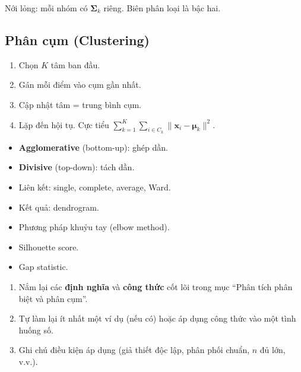 \documentclass[12pt,a4paper]{article}
\begin{document}
\begin{dinhnghia}[title={QDA (Quadratic DA)}]
  Nới lỏng: mỗi nhóm có $\boldsymbol{\Sigma}_k$ riêng. Biên phân loại là bậc hai.
\end{dinhnghia}

\subsection{Phân cụm (Clustering)}

\begin{phuongphap}[title={K-means}]
  \begin{enumerate}
    \item Chọn $K$ tâm ban đầu.
    \item Gán mỗi điểm vào cụm gần nhất.
    \item Cập nhật tâm = trung bình cụm.
    \item Lặp đến hội tụ. Cực tiểu $\sum_{k=1}^K \sum_{i \in C_k} \|\mathbf{x}_i - \boldsymbol{\mu}_k\|^2$.
  \end{enumerate}
\end{phuongphap}

\begin{phuongphap}[title={Phân cụm phân cấp}]
  \begin{itemize}
    \item \textbf{Agglomerative} (bottom-up): ghép dần.
    \item \textbf{Divisive} (top-down): tách dần.
    \item Liên kết: single, complete, average, Ward.
    \item Kết quả: dendrogram.
  \end{itemize}
\end{phuongphap}

\begin{phuongphap}[title={Chọn số cụm}]
  \begin{itemize}
    \item Phương pháp khuỷu tay (elbow method).
    \item Silhouette score.
    \item Gap statistic.
  \end{itemize}
\end{phuongphap}

\begin{tongket}[title={Tổng kết: Phân tích phân biệt và phân cụm}]
\begin{enumerate}
  \item Nắm lại các \textbf{định nghĩa} và \textbf{công thức} cốt lõi trong mục ``Phân tích phân biệt và phân cụm''.
  \item Tự làm lại ít nhất một ví dụ (nếu có) hoặc áp dụng công thức vào một tình huống số.
  \item Ghi chú điều kiện áp dụng (giả thiết độc lập, phân phối chuẩn, $n$ đủ lớn, v.v.).
\end{enumerate}
\end{tongket}
\end{document}
